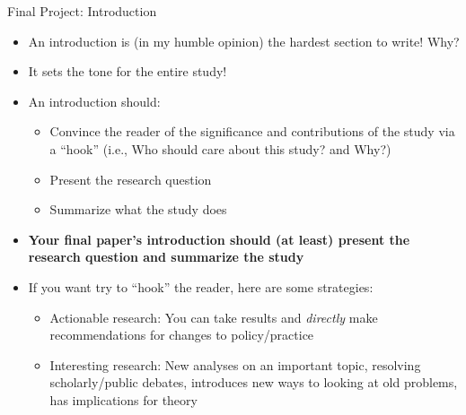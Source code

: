 \documentclass[
  8pt,
  ignorenonframetext,
  dvipsnames]{beamer}
\providecommand{\tightlist}{%
  \setlength{\itemsep}{0pt}\setlength{\parskip}{0pt}}
\renewcommand{\textbf}[1]{{\color{darkgray}\bfseries\fontfamily{Montserrat-TOsF}#1}}
\let\olditem\item
\renewcommand{\item}{%
  \olditem\vspace{4pt}
}
\begin{document}
\begin{frame}{Final Project: Introduction}
\protect\hypertarget{final-project-introduction}{}

\begin{itemize}
\tightlist
\item
  An introduction is (in my humble opinion) the hardest section to
  write! Why?
\item
  It sets the tone for the entire study!
\item
  An introduction should:

  \begin{itemize}
  \tightlist
  \item
    Convince the reader of the significance and contributions of the
    study via a ``hook'' (i.e., Who should care about this study? and
    Why?)
  \item
    Present the research question
  \item
    Summarize what the study does
  \end{itemize}
\end{itemize}

\medskip

\begin{itemize}
\tightlist
\item
  \textbf{Your final paper's introduction should (at least) present the
  research question and summarize the study}
\end{itemize}

\medskip

\begin{itemize}
\tightlist
\item
  If you want try to ``hook'' the reader, here are some strategies:

  \begin{itemize}
  \tightlist
  \item
    Actionable research: You can take results and \emph{directly} make
    recommendations for changes to policy/practice
  \item
    Interesting research: New analyses on an important topic, resolving
    scholarly/public debates, introduces new ways to looking at old
    problems, has implications for theory
  \end{itemize}
\end{itemize}

\end{frame}
\end{document}
